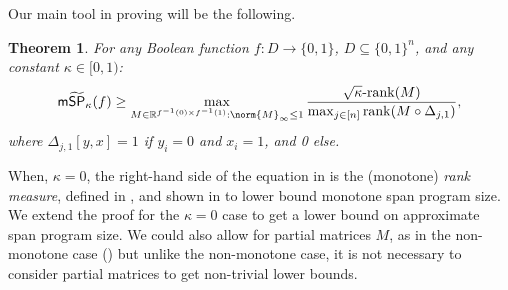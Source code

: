 \documentclass[11pt]{article}
\numberwithin{equation}{section}
\newtheorem{theorem}{Theorem}[section]
\theoremstyle{definition}
\theoremstyle{plain}
\newcommand{\R}{\mathbb R}
\begin{document}
\noindent Our main tool in proving  will be the following.
\begin{theorem}\label{thm:approx-rank-mSP}
For any Boolean function $f:D\rightarrow\{0,1\}$, $D\subseteq \{0,1\}^n$, and any constant $\kappa\in [0,1)$:
$$\mathsf{m}\widetilde{\mathsf{SP}}_{\kappa}(f)\geq \max_{M\in\R^{f^{-1}(0)\times f^{-1}(1)}:\norm{M}_\infty\leq 1}\frac{\sqrt{\kappa}\mbox{-}\mathrm{rank}(M)}{\max_{j\in [n]}\mathrm{rank}(M\circ\Delta_{j,1})},$$
where $\Delta_{j,1}[y,x]=1$ if $y_i=0$ and $x_i=1$, and 0 else. 
\end{theorem}
When, $\kappa=0$, the right-hand side of the equation in  is the (monotone) \emph{rank measure}, defined in \cite{Raz90}, and shown in \cite{Gal01} to lower bound monotone span program size. We extend the proof for the $\kappa=0$ case to get a lower bound on approximate span program size. We could also allow for partial matrices $M$, as in the non-monotone case () but unlike the non-monotone case, it is not necessary to consider partial matrices to get non-trivial lower bounds.
\end{document}
